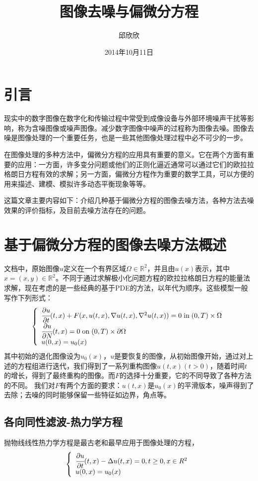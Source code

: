 \documentclass[a4paper,12pt]{article}
\title{图像去噪与偏微分方程}
\author{邱欣欣}
\date{2014年10月11日}
\begin{document}
\maketitle

\section{引言}

现实中的数字图像在数字化和传输过程中常受到成像设备与外部环境噪声干扰等影响，称为含噪图像或噪声图像。减少数字图像中噪声的过程称为图像去噪。图像去噪是图像处理的一个重要任务，也是一些其他图像处理过程中必不可少的一步。

在图像处理的多种方法中，偏微分方程的应用具有重要的意义。它在两个方面有重要的应用：一方面，许多变分问题或他们的正则化逼近通常可以通过它们的欧拉拉格朗日方程有效的求解；另一方面，偏微分方程作为重要的数学工具，可以方便的用来描述、建模、模拟许多动态平衡现象等等。

这篇文章主要内容如下：介绍几种基于偏微分方程的图像去噪方法，各种方法去噪效果的评价指标，及目前去噪方法存在的问题。

\section{基于偏微分方程的图像去噪方法概述}
文档中，原始图像$u$定义在一个有界区域$\Omega\in \mathbb{R}^2$，并且由$u(x)$表示，其中$x=(x,y)\in \mathbb{R}^2$。不同于通过求解极小化问题方程的欧拉拉格朗日方程的能量法求解，现在考虑的是一些经典的基于PDE的方法，以年代为顺序。这些模型一般写作下列形式：
\begin{displaymath}
\left\{\begin{array}{lll}
\cfrac{\partial u}{\partial t}(t,x)+F(x,u(t,x),\nabla u(t,x),\nabla^2 u(t,x))=0 \;\mathrm{in}\;(0,T)\times\Omega\\
\cfrac{\partial u}{\partial N}(t,x)=0 \;\mathrm{on}\;(0,T)\times{\partial \Omega}\\
u(0,x)=u_0(x)
\end{array} \right.
\end{displaymath}
其中初始的退化图像设为$u_0(x)$，$u$是要恢复的图像，从初始图像开始，通过对上述的方程组进行迭代，我们得到了一系列重构图像$u(t,x)(t>0)$，随着时间$t$的增长，得到了最终重构的图像。而$F$的选择十分重要，它的不同导致了各种方法的不同。 我们对$F$有两个方面的要求：$u(t,x)$是$u_0(x)$的平滑版本，噪声得到了去除；去噪的同时能够保留一些特征如边界，角点等。

\subsection{各向同性滤波-热力学方程}
抛物线线性热力学方程是最古老和最早应用于图像处理的方程\cite{ter1994geometry}\cite{koenderink1984structure}，\begin{displaymath}
\left\{\begin{array}{ll}
\cfrac{\partial u}{\partial t}(t,x)-\Delta u(t,x)=0, t\geq 0, x\in R^2\\
u(0,x)=u_0(x)
\end{array}\right.
\end{displaymath}
\end{document}
